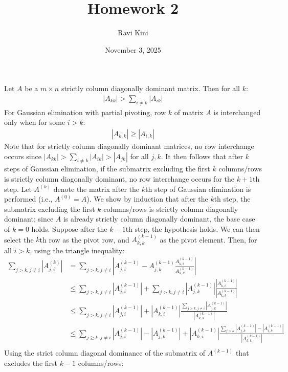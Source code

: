\documentclass{article}
\title{Homework 2}
\author{Ravi Kini}
\date{November 3, 2025}
\begin{document}
\maketitle

\problem{}
Let $A$ be a $m \times n$ strictly column diagonally dominant matrix. Then for all $k$:
\begin{align*}
    |A_{kk}| > \sum_{i \neq k} |A_{ik}|
\end{align*}
For Gaussian elimination with partial pivoting, row $k$ of matrix $A$ is interchanged only when for some $i > k$:
\begin{align*}
    |A_{k,k}| \geq |A_{i,k}|
\end{align*}
Note that for strictly column diagonally dominant matrices, no row interchange occurs since $|A_{kk}| > \sum_{i \neq k} |A_{ik}| > |A_{jk}|$ for all $j, k$. It then follows that after $k$ steps of Gaussian elimination, if the submatrix excluding the first $k$ columns/rows is strictly column diagonally dominant, no row interchange occurs for the $k + 1$th step. Let $A^{(k)}$ denote the matrix after the $k$th step of Gaussian elimination is performed (i.e., $A^{(0)} = A$). We show by induction that after the $k$th step, the submatrix excluding the first $k$ columns/rows is strictly column diagonally dominant; since $A$ is already strictly column diagonally dominant, the base case of $k = 0$ holds. Suppose after the $k - 1$th step, the hypothesis holds. We can then select the $k$th row as the pivot row, and $A^{(k-1)}_{k,k}$ as the pivot element. Then, for all $i > k$, using the triangle inequality:
\begin{align*}
    \sum_{j > k, j \neq i} |A^{(k)}_{j,i}| & = \sum_{j > k, j \neq i} \left|A^{(k - 1)}_{j,i} - A^{(k-1)}_{j,k}\frac{A^{(k-1)}_{k,i}}{A^{(k-1)}_{k,k}}\right| \\
    & \leq \sum_{j > k, j \neq i} |A^{(k - 1)}_{j,i}| + \sum_{j > k, j \neq i}|A^{(k-1)}_{j,k}|\frac{|A^{(k-1)}_{k,i}|}{|A^{(k-1)}_{k,k}|} \\
    & \leq \sum_{j > k, j \neq i} |A^{(k - 1)}_{j,i}| + |A^{(k-1)}_{k,i}| \frac{\sum_{j > k, j \neq i} |A^{(k-1)}_{j,k}|}{|A^{(k-1)}_{k,k}|} \\
    & \leq \sum_{j \geq k, j \neq i} |A^{(k - 1)}_{j,i}| - |A^{(k - 1)}_{j,k}| + |A^{(k-1)}_{k,i}| \frac{\sum_{j > k} |A^{(k-1)}_{j,k}| - |A^{(k-1)}_{i,k}|}{|A^{(k-1)}_{k,k}|} \\
\end{align*}
Using the strict column diagonal dominance of the submatrix of $A^{(k-1)}$ that excludes the first $k - 1$ columns/rows:
\end{document}
